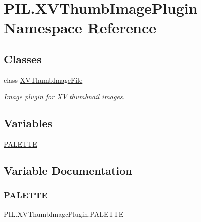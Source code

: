 \hypertarget{namespacePIL_1_1XVThumbImagePlugin}{}\section{P\+I\+L.\+X\+V\+Thumb\+Image\+Plugin Namespace Reference}
\label{namespacePIL_1_1XVThumbImagePlugin}
\subsection*{Classes}
\begin{DoxyCompactItemize}
\item 
class \hyperlink{classPIL_1_1XVThumbImagePlugin_1_1XVThumbImageFile}{X\+V\+Thumb\+Image\+File}
\begin{DoxyCompactList}\small\item\em \hyperlink{namespacePIL_1_1Image}{Image} plugin for XV thumbnail images. \end{DoxyCompactList}\end{DoxyCompactItemize}
\subsection*{Variables}
\begin{DoxyCompactItemize}
\item 
\hyperlink{namespacePIL_1_1XVThumbImagePlugin_a2f3771c64cdb91eaf5bd0318b4b5dd47}{P\+A\+L\+E\+T\+TE}
\end{DoxyCompactItemize}


\subsection{Variable Documentation}
\mbox{\label{namespacePIL_1_1XVThumbImagePlugin_a2f3771c64cdb91eaf5bd0318b4b5dd47}} 
\subsubsection{\texorpdfstring{P\+A\+L\+E\+T\+TE}{PALETTE}}
{\footnotesize\ttfamily P\+I\+L.\+X\+V\+Thumb\+Image\+Plugin.\+P\+A\+L\+E\+T\+TE}

